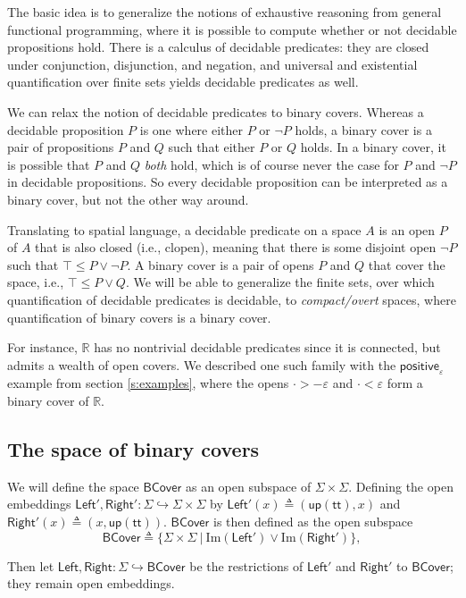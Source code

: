 \documentclass[conference]{IEEEtran}
\newcommand{\hookto}{\hookrightarrow}
\newcommand{\R}{\mathbb{R}}
\newcommand{\suchthat}{\ |\ }
\newcommand{\Img}[1]{\text{Im}\left({#1}\right)}
\newcommand{\strue}{\mathsf{up}(\mathsf{tt})}
\newcommand{\BCover}{\mathsf{BCover}}
\begin{document}
The basic idea is to generalize the notions of exhaustive reasoning from general functional programming, where it is possible to compute whether or not decidable propositions hold. There is a calculus of decidable predicates: they are closed under conjunction, disjunction, and negation, and universal and existential quantification over finite sets yields decidable predicates as well.

We can relax the notion of decidable predicates to binary covers. Whereas a decidable proposition $P$ is one where either $P$ or $\neg P$ holds, a binary cover is a pair of propositions $P$ and $Q$ such that either $P$ or $Q$ holds. In a binary cover, it is possible that $P$ and $Q$ \emph{both} hold, which is of course never the case for $P$ and $\neg P$ in decidable propositions. So every decidable proposition can be interpreted as a binary cover, but not the other way around.

Translating to spatial language, a decidable predicate on a space $A$ is an open $P$ of $A$ that is also closed (i.e., clopen), meaning that there is some disjoint open $\neg P$ such that $\top \le P \vee \neg P$. A binary cover is a pair of opens $P$ and $Q$ that cover the space, i.e., $\top \le P \vee Q$. We will be able to generalize the finite sets, over which quantification of decidable predicates is decidable, to \emph{compact/overt} spaces, where quantification of binary covers is a binary cover.

For instance, $\R$ has no nontrivial decidable predicates since it is connected, but admits a wealth of open covers. We described one such family with the $\mathsf{positive}_\varepsilon$ example from section \ref{s:examples}, where the opens $\cdot > - \varepsilon$ and $\cdot < \varepsilon$ form a binary cover of $\R$.

\subsection{The space of binary covers}

We will define the space $\BCover$ as an open subspace of $\Sigma \times \Sigma$. Defining the open embeddings $\mathsf{Left}', \mathsf{Right}' : \Sigma \hookto \Sigma \times \Sigma$ by 
$\mathsf{Left}'(x) \triangleq (\strue, x)$ and
$\mathsf{Right}'(x) \triangleq (x, \strue)$.
$\BCover$ is then defined as the open subspace
\[
\BCover \triangleq \{ \Sigma \times \Sigma \suchthat \Img{\mathsf{Left}'} \vee \Img{\mathsf{Right}'} \},
\]

Then let $\mathsf{Left}, \mathsf{Right} : \Sigma \hookto \BCover$ be the restrictions of $\mathsf{Left}'$ and $\mathsf{Right}'$ to $\BCover$; they remain open embeddings.
\end{document}
